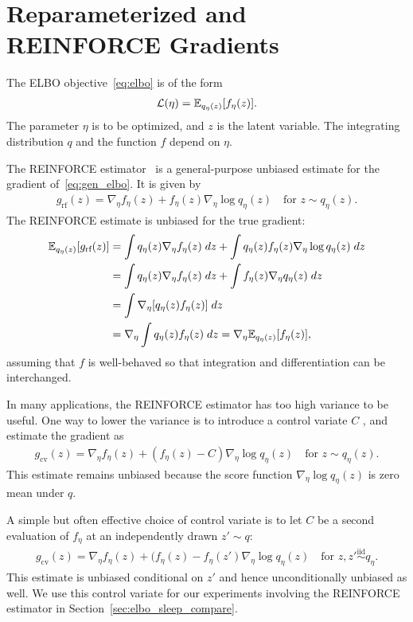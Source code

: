 \section{Reparameterized and REINFORCE Gradients}
\label{sec:reparam_details}

The ELBO objective~\eqref{eq:elbo} is of the form
\begin{align}
    \mathcal{L}(\eta) = \mathbb{E}_{q_\eta(z)}[f_\eta(z)].
    \label{eq:gen_elbo}
\end{align}
The parameter $\eta$ is to be optimized, and $z$ is the latent variable. The integrating distribution $q$ and the function $f$ depend on $\eta$.

The REINFORCE estimator~\citep{Williams1992reinforce} is a general-purpose unbiased estimate for the gradient of~\eqref{eq:gen_elbo}.
It is given by
\begin{align}
    g_{\textrm{rf}}(z) = \nabla_\eta f_\eta(z) +
            f_\eta(z)  \nabla_\eta \log q_\eta(z)
    \quad \text{for }
    z\sim q_\eta(z).
\end{align}
The REINFORCE estimate is unbiased for the true gradient:
\begin{align}
    \mathbb{E}_{q_\eta(z)}[g_{\textrm{rf}}(z)] &=
    \int q_\eta(z) \nabla_\eta f_\eta(z) \; dz+
    \int q_\eta(z) f_\eta(z)  \nabla_\eta \log q_\eta(z)\; dz \\
    &= \int q_\eta(z) \nabla_\eta f_\eta(z) \; dz+
    \int f_\eta(z) \nabla_\eta q_\eta(z)  \; dz \\
    &= \int \nabla_\eta[q_\eta(z) f_\eta(z)] \; dz \\
    &= \nabla_\eta \int q_\eta(z) f_\eta(z) \; dz
    = \nabla_\eta \mathbb{E}_{q_\eta(z)}[f_\eta(z)],
\end{align}
assuming that $f$ is well-behaved so that integration and differentiation can be interchanged.

In many applications,
the REINFORCE estimator has too high variance to be useful. One way to lower the variance is to introduce a control variate $C$
\citep{ranganath2013black}, and estimate the gradient as 
\begin{align}
    g_{\textrm{cv}}(z) = \nabla_\eta f_\eta(z) +
        (f_\eta(z) - C)  \nabla_\eta \log q_\eta(z)
    \quad \text{for }
    z\sim q_\eta(z).
\end{align}
This estimate remains unbiased because the score function 
$\nabla_\eta \log q_\eta(z)$ is zero mean under $q$.

A simple but often effective choice of control variate is to let 
$C$ be a second evaluation of $f_\eta$ at an independently drawn $z'\sim q$:
\begin{align}
    g_{\textrm{cv}}(z) = \nabla_\eta f_\eta(z) +
        (f_\eta(z) - f_\eta(z')  \nabla_\eta \log q_\eta(z)
    \quad \text{for }
    z, z' \overset{\mathrm{iid}} \sim q_\eta.
    \label{eq:control_var}
\end{align}
This estimate is unbiased conditional on $z'$ and hence unconditionally unbiased as well. 
We use this control variate for our experiments involving 
the REINFORCE estimator in Section~\ref{sec:elbo_sleep_compare}. 


